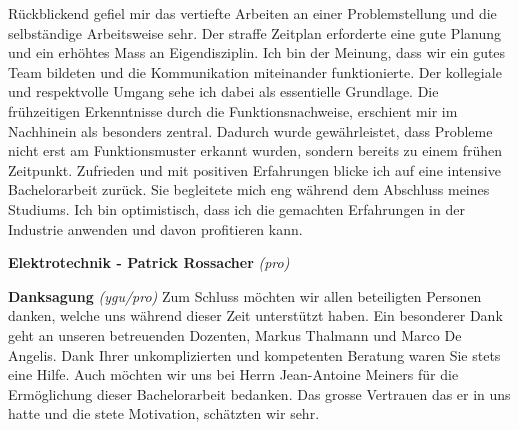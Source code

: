Rückblickend gefiel mir das vertiefte Arbeiten an einer Problemstellung und die selbständige Arbeitsweise sehr. Der straffe Zeitplan erforderte eine gute Planung und ein erhöhtes Mass an Eigendisziplin. Ich bin der Meinung, dass wir ein gutes Team bildeten und die Kommunikation miteinander funktionierte. Der kollegiale und respektvolle Umgang sehe ich dabei als essentielle Grundlage. Die frühzeitigen Erkenntnisse durch die Funktionsnachweise, erschient mir im Nachhinein als besonders zentral. Dadurch wurde gewährleistet, dass Probleme nicht erst am Funktionsmuster erkannt wurden, sondern bereits zu einem frühen Zeitpunkt.
\newline
Zufrieden und mit positiven Erfahrungen blicke ich auf eine intensive Bachelorarbeit zurück. Sie begleitete mich eng während dem Abschluss meines Studiums. Ich bin optimistisch, dass ich die gemachten Erfahrungen in der Industrie anwenden und davon profitieren kann.
\newline

\textbf{Elektrotechnik - Patrick Rossacher}
\newline
\textit{(pro)}
\newline	

\textbf{Danksagung}
\newline
\textit{(ygu/pro)} Zum Schluss möchten wir allen beteiligten Personen danken, welche uns während dieser Zeit unterstützt haben. Ein besonderer Dank geht an unseren betreuenden Dozenten, Markus Thalmann und Marco De Angelis. Dank Ihrer unkomplizierten und kompetenten Beratung waren Sie stets eine Hilfe. Auch möchten wir uns bei Herrn Jean-Antoine Meiners für die Ermöglichung dieser Bachelorarbeit bedanken. Das grosse Vertrauen das er in uns hatte und die stete Motivation, schätzten wir sehr.

